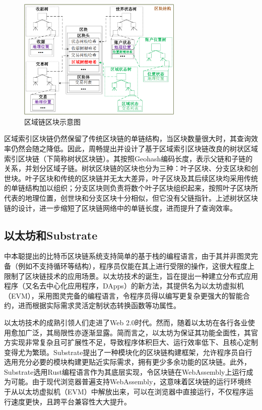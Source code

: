 \begin{figure}[htbp]
  \centering
  \includegraphics[width=0.7\textwidth]{images/区域链区块示意图.png}
  \caption{区域链区块示意图}\label{区域链区块示意图} %
\end{figure}

区域索引区块链仍然保留了传统区块链的单链结构，当区块数量很大时，其查询效率仍然会随之降低。因此，周畅提出并设计了基于区域索引区块链改良的树状区域索引区块链（下简称树状区块链）。其按照Geohash编码长度，表示父链和子链的关系，并划分区域子链。树状区块链的区块也分为三种：叶子区块、分支区块和创世块。叶子区块和传统的区块链并无太大差异，叶子区块及其后续区块均采用传统的单链结构加以组织；分支区块则负责将数个叶子区块组织起来，按照叶子区块所代表的地理位置，创世块和分支区块十分相似，但它没有父链指针。上述树状区块链的设计，进一步缩短了区块链网络中的单链长度，进而提升了查询效率。

\subsection{以太坊和Substrate}

中本聪提出的比特币区块链系统支持简单的基于栈的编程语言，由于其并非图灵完备（例如不支持循环等结构），程序员仅能在其上进行受限的操作，这很大程度上限制了区块链技术的应用场景。以太坊\cite{ethereumWhitePaper}技术的诞生，旨在提出一种建立分布式应用程序（又名去中心化应用程序，DApps）的新方法，其提供名为以太坊虚拟机（EVM），采用图灵完备的编程语言，令程序员得以编写更复杂更强大的智能合约，进而根据实际需求灵活定制状态转换函数等功属性。

以太坊技术的成熟引领人们走进了Web 2.0时代。然而，随着以太坊在各行各业使用愈加广泛，其局限性亦逐渐显露。简而言之，以太坊为保证其功能全面性，其官方实现非常复杂且可扩展性不足，导致程序体积巨大、运行效率低下、且核心定制变得尤为繁琐。Substrate提出了一种模块化的区块链构建框架，允许程序员自行选用充分必要的模块构建更贴近实际需求，拥有更少多余功能的区块链。此外，Substrate选用Rust编程语言作为其底层实现，令区块链在WebAssembly上运行成为可能。由于现代浏览器普遍支持WebAssembly，这意味着区块链的运行环境终于从以太坊虚拟机（EVM）中解放出来，可以在浏览器中直接运行，不仅程序运行速度更快，且跨平台兼容性大大提升。

